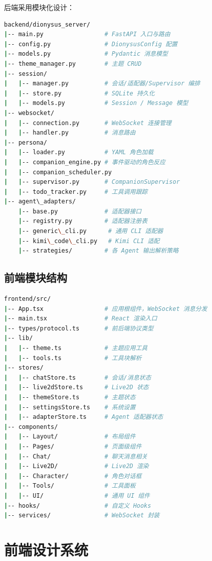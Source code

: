 \documentclass[12pt,a4paper]{article}
\begin{document}
后端采用模块化设计：

\begin{lstlisting}[language=bash]
backend/dionysus_server/
|-- main.py                 # FastAPI 入口与路由
|-- config.py               # DionysusConfig 配置
|-- models.py               # Pydantic 消息模型
|-- theme_manager.py        # 主题 CRUD
|-- session/
|   |-- manager.py          # 会话/适配器/Supervisor 编排
|   |-- store.py            # SQLite 持久化
|   |-- models.py           # Session / Message 模型
|-- websocket/
|   |-- connection.py       # WebSocket 连接管理
|   |-- handler.py          # 消息路由
|-- persona/
|   |-- loader.py           # YAML 角色加载
|   |-- companion_engine.py # 事件驱动的角色反应
|   |-- companion_scheduler.py
|   |-- supervisor.py       # CompanionSupervisor
|   |-- todo_tracker.py     # 工具调用跟踪
|-- agent\_adapters/
    |-- base.py             # 适配器接口
    |-- registry.py         # 适配器注册表
    |-- generic\_cli.py      # 通用 CLI 适配器
    |-- kimi\_code\_cli.py   # Kimi CLI 适配
    |-- strategies/         # 各 Agent 输出解析策略
\end{lstlisting}

\subsection{前端模块结构}

\begin{lstlisting}[language=bash]
frontend/src/
|-- App.tsx                 # 应用根组件，WebSocket 消息分发
|-- main.tsx                # React 渲染入口
|-- types/protocol.ts       # 前后端协议类型
|-- lib/
|   |-- theme.ts            # 主题应用工具
|   |-- tools.ts            # 工具块解析
|-- stores/
|   |-- chatStore.ts        # 会话/消息状态
|   |-- live2dStore.ts      # Live2D 状态
|   |-- themeStore.ts       # 主题状态
|   |-- settingsStore.ts    # 系统设置
|   |-- adapterStore.ts     # Agent 适配器状态
|-- components/
|   |-- Layout/             # 布局组件
|   |-- Pages/              # 页面级组件
|   |-- Chat/               # 聊天消息相关
|   |-- Live2D/             # Live2D 渲染
|   |-- Character/          # 角色对话框
|   |-- Tools/              # 工具面板
|   |-- UI/                 # 通用 UI 组件
|-- hooks/                  # 自定义 Hooks
|-- services/               # WebSocket 封装
\end{lstlisting}

\section{前端设计系统}
\end{document}
